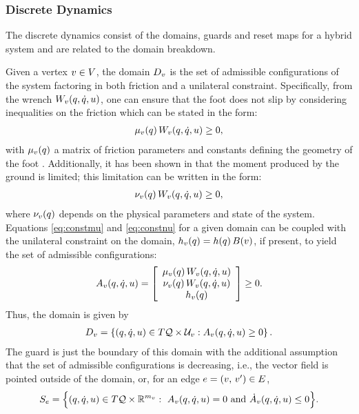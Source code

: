 \subsubsection{Discrete Dynamics} \label{sec:discrete-dynamics}

The discrete dynamics consist of the domains, guards and reset maps for a hybrid
system and are related to the domain breakdown.

Given a vertex $v \in V$, the domain $D_{v}$ is the set of admissible
configurations of the system factoring in both friction and a unilateral
constraint.
%
Specifically, from the wrench $W_{v}(q, \dot{q}, u)$, one can ensure that the foot
does not slip by considering inequalities on the friction which can be stated in
the form:
%
\begin{align}
  \label{eq:constmu}
  \mu_{v}(q) \, W_{v}(q, \dot{q}, u) \geq 0,
\end{align}
%
with $\mu_{v}(q)$ a matrix of friction parameters and constants defining the
geometry of the foot \cite{Grizzle2010}.
%
Additionally, it has been shown in \cite{Chevallereau2009, Vukobratovic1990}
that the moment produced by the ground is limited; this limitation can be
written in the form:
%
\begin{align}
  \label{eq:constnu}
  \nu_{v}(q) \, W_{v}(q, \dot{q}, u) \geq 0,
\end{align}
%
where $\nu_{v}(q)$ depends on the physical parameters and state of the
system.
%
Equations \eqref{eq:constmu} and \eqref{eq:constnu} for a given domain can be
coupled with the unilateral constraint on the domain, $h_{v}(q) = h(q) \,
B(v)$, if present, to yield the set of admissible configurations:
%
\begin{align}
  \label{admissible}
  A_{v}(q, \dot{q}, u) = \left[ \begin{array}{c}
      \mu_{v}(q) \, W_{v}(q, \dot{q}, u)\\
      \nu_{v}(q) \, W_{v}(q, \dot{q}, u)\\
      h_{v}(q)
    \end{array} \right] \geq 0.
\end{align}
%
Thus, the domain is given by
%
\begin{align}
  \label{eq:domain}
  D_{v} = \left\{ (q, \dot{q}, u) \in T\mathcal{Q} \times \mathcal{U}_{v} : A_{v}(q, \dot{q}, u) \geq 0 \right\}.
\end{align}
%
The guard is just the boundary of this domain with the additional assumption
that the set of admissible configurations is decreasing, i.e., the vector field
is pointed outside of the domain, or, for an edge $e = (v, \, v') \in E$,
%
\begin{align*}
  S_{e} = \Bigl\{ (q, \dot{q}, u) \in T\mathcal{Q} \times \mathbb{R}^{m_{v}} : \ A_{v}(q, \dot{q}, u) =
  0 \mbox{ and } {\dot A}_{v}(q, \dot{q}, u) \leq 0 \Bigl\}.
\end{align*}

